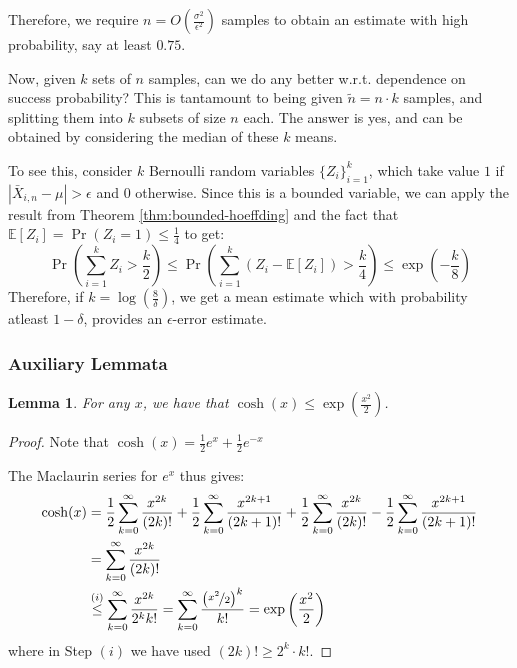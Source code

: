 \documentclass{article}
\newtheorem{lemma}{Lemma}[subsection]
\theoremstyle{remark}
\newcommand{\Exp}{\mathbb{E}}
\begin{document}
Therefore, we require \(n = O\left(\frac{\sigma^{2}}{\epsilon^{2}}\right)\) samples to obtain an estimate with high probability, say at least \(0.75\).

Now, given \(k\) sets of \(n\) samples, can we do any better w.r.t. dependence on success probability? This is tantamount to being given \(\tilde{n} = n\cdot k\) samples, and splitting them into \(k\) subsets of size \(n\) each. The answer is yes, and can be obtained by considering the median of these \(k\) means.

To see this, consider \(k\) Bernoulli random variables \(\{Z_{i}\}_{i=1}^{k}\), which take value \(1\) if \(|\bar{X}_{i,n} - \mu| > \epsilon\) and \(0\) otherwise. Since this is a bounded variable, we can apply the result from Theorem \ref{thm:bounded-hoeffding} and the fact that \(\Exp[Z_{i}] = \Pr(Z_{i} = 1) \leq \frac{1}{4}\) to get:
\begin{equation*}
\Pr\left(\sum_{i=1}^{k} Z_{i} > \frac{k}{2}\right) \leq \Pr\left(\sum_{i=1}^{k} (Z_{i} - \Exp[Z_{i}]) > \frac{k}{4}\right) \leq \exp\left(-\frac{k}{8}\right)
\end{equation*}
Therefore, if \(k = \log\left(\frac{8}{\delta}\right)\), we get a mean estimate which with probability atleast \(1 - \delta\), provides an \(\epsilon\)-error estimate.

\subsubsection{Auxiliary Lemmata}
\begin{lemma}
\label{lem:cosh-upper}
For any \(x\), we have that \(\cosh(x) \leq \exp\left(\frac{x^{2}}{2}\right)\).
\end{lemma}

\begin{proof}
Note that \(\cosh(x) = \frac{1}{2}e^{x} + \frac{1}{2}e^{-x}\)

The Maclaurin series for \(e^{x}\) thus gives:
\begin{align*}
\cosh(x) &= \frac{1}{2}\sum_{k=0}^{\infty} \frac{x^{2k}}{(2k)!} + \frac{1}{2}\sum_{k=0}^{\infty} \frac{x^{2k + 1}}{(2k + 1)!} + \frac{1}{2}\sum_{k=0}^{\infty} \frac{x^{2k}}{(2k)!} - \frac{1}{2}\sum_{k=0}^{\infty} \frac{x^{2k + 1}}{(2k + 1)!} \\
&= \sum_{k=0}^{\infty} \frac{x^{2k}}{(2k)!} \\
&\overset{(i)}\leq \sum_{k=0}^{\infty} \frac{x^{2k}}{2^{k}k!} = \sum_{k=0}^{\infty} \frac{\left(\nicefrac{x^{2}}{2}\right)^{k}}{k!} = \exp\left(\frac{x^{2}}{2}\right)
\end{align*}
where in Step \((i)\) we have used \((2k)! \geq 2^{k}\cdot k!\).
\end{proof}
\end{document}
